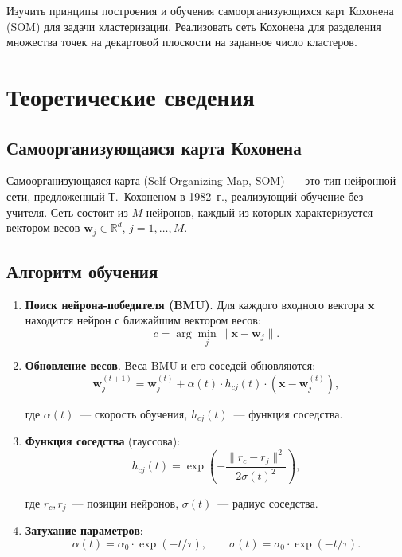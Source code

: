 \documentclass[14pt,a4paper]{extarticle}
\begin{document}
Изучить принципы построения и обучения самоорганизующихся карт Кохонена (SOM) для задачи кластеризации. Реализовать сеть Кохонена для разделения множества точек на декартовой плоскости на заданное число кластеров.

\section{Теоретические сведения}

\subsection{Самоорганизующаяся карта Кохонена}

Самоорганизующаяся карта (Self-Organizing Map, SOM)~--- это тип нейронной сети, предложенный Т.~Кохоненом в 1982~г., реализующий обучение без учителя. Сеть состоит из $M$ нейронов, каждый из которых характеризуется вектором весов $\mathbf{w}_j \in \mathbb{R}^d$, $j = 1, \ldots, M$.

\subsection{Алгоритм обучения}

\begin{enumerate}
\item \textbf{Поиск нейрона-победителя (BMU)}. Для каждого входного вектора $\mathbf{x}$ находится нейрон с ближайшим вектором весов:
\begin{equation}
c = \arg\min_{j} \|\mathbf{x} - \mathbf{w}_j\|.
\end{equation}

\item \textbf{Обновление весов}. Веса BMU и его соседей обновляются:
\begin{equation}
\mathbf{w}_j^{(t+1)} = \mathbf{w}_j^{(t)} + \alpha(t) \cdot h_{cj}(t) \cdot (\mathbf{x} - \mathbf{w}_j^{(t)}),
\end{equation}

где $\alpha(t)$~--- скорость обучения, $h_{cj}(t)$~--- функция соседства.

\item \textbf{Функция соседства} (гауссова):
\begin{equation}
h_{cj}(t) = \exp\left(-\frac{\|r_c - r_j\|^2}{2\sigma(t)^2}\right),
\end{equation}

где $r_c, r_j$~--- позиции нейронов, $\sigma(t)$~--- радиус соседства.

\item \textbf{Затухание параметров}:
\begin{equation}
\alpha(t) = \alpha_0 \cdot \exp(-t/\tau), \qquad
\sigma(t) = \sigma_0 \cdot \exp(-t/\tau).
\end{equation}
\end{enumerate}
\end{document}
